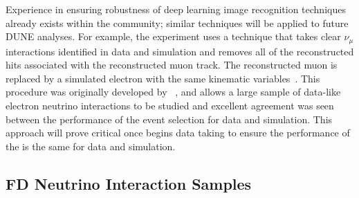 

Experience in ensuring robustness of deep learning image recognition techniques already exists within the community; similar techniques will be applied to future DUNE analyses. For example, the  experiment uses a technique that takes clear $\nu_{\mu}$  interactions identified in data and simulation and removes all of the reconstructed hits associated with the reconstructed muon track. The reconstructed muon is replaced by a simulated electron with the same kinematic variables~\cite{Sachdev:2015hpa,Gandrajula:2018ytr}. This procedure was originally developed by ~\cite{Boehm:2009zz}, and allows a large sample of data-like electron neutrino interactions to be studied and excellent agreement was seen between the performance of the event selection for data and simulation. This approach will prove critical once  begins data taking to ensure the performance of the  is the same for data and simulation.

\subsection{FD Neutrino Interaction Samples}

